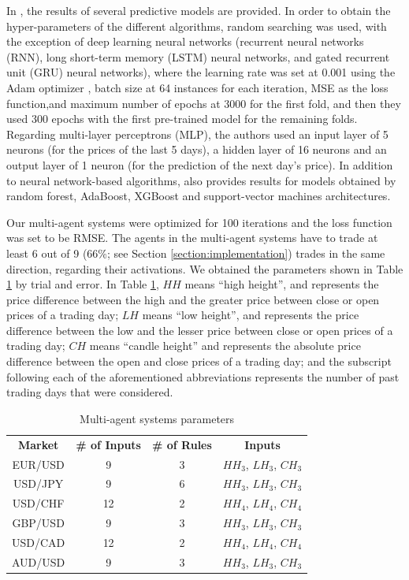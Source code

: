 \documentclass{ieeeaccess}
\begin{document}
In \cite{Munkhdalai2019}, the results of several predictive models are
provided. In order to obtain the hyper-parameters of the different
algorithms, random searching was used, with the exception of deep
learning neural networks (recurrent neural networks (RNN), long
short-term memory (LSTM) neural networks, and gated recurrent unit
(GRU) neural networks), where the learning rate was set at 0.001 using
the Adam optimizer \cite{kingma2014adam}, batch size at 64 instances
for each iteration, MSE as the loss function,and maximum number of
epochs at 3000 for the first fold, and then they used 300 epochs with
the first pre-trained model for the remaining folds. Regarding
multi-layer perceptrons (MLP), the authors used an input layer of 5 neurons
(for the prices of the last 5 days), a hidden layer of 16 neurons and
an output layer of 1 neuron (for the prediction of the next day's
price). In addition to neural network-based algorithms,
\cite{kingma2014adam} also provides results for models obtained by
random forest, AdaBoost, XGBoost and support-vector machines
architectures.

Our multi-agent systems were optimized for 100 iterations and the loss
function was set to be RMSE. The agents in the multi-agent systems
have to trade at least 6 out of 9 (66\%; see Section
\ref{section:implementation}) trades in the same direction, regarding
their activations. We obtained the parameters shown in Table
\ref{agents-parameters} by trial and error. In Table
\ref{agents-parameters}, $HH$ means ``high height'', and represents
the price difference between the high and the greater price between
close or open prices of a trading day; $LH$ means ``low height'', and
represents the price difference between the low and the lesser price
between close or open prices of a trading day; $CH$ means ``candle
height'' and represents the absolute price difference between the open
and close prices of a trading day; and the subscript following each of
the aforementioned abbreviations represents the number of past trading
days that were considered.


\begin{table}[]
  \caption{Multi-agent systems parameters}
  \small
  \centering
  \begin{tabular}{cccc}
    \textbf{Market} & \textbf{\# of Inputs} & \textbf{\# of Rules} & \textbf{Inputs} \\
    EUR/USD & 9 & 3 & $HH_3$, $LH_3$, $CH_3$ \\
    USD/JPY & 9 & 6 & $HH_3$, $LH_3$, $CH_3$ \\
    USD/CHF & 12 & 2 & $HH_4$, $LH_4$, $CH_4$ \\
    GBP/USD & 9 & 3 & $HH_3$, $LH_3$, $CH_3$ \\
    USD/CAD & 12 & 2 & $HH_4$, $LH_4$, $CH_4$ \\
    AUD/USD & 9 & 3 & $HH_3$, $LH_3$, $CH_3$ \\
  \end{tabular}
  \label{agents-parameters}
\end{table}
\end{document}
